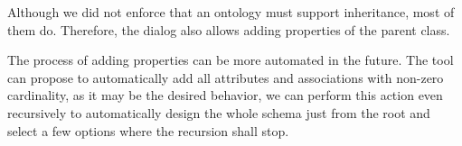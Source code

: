 Although we did not enforce that an ontology must support inheritance, most of them do. Therefore, the dialog also allows adding properties of the parent class.

\medskip

The process of adding properties can be more automated in the future. The tool can propose to automatically add all attributes and associations with non-zero cardinality, as it may be the desired behavior, we can perform this action even recursively to automatically design the whole schema just from the root and select a few options where the recursion shall stop.